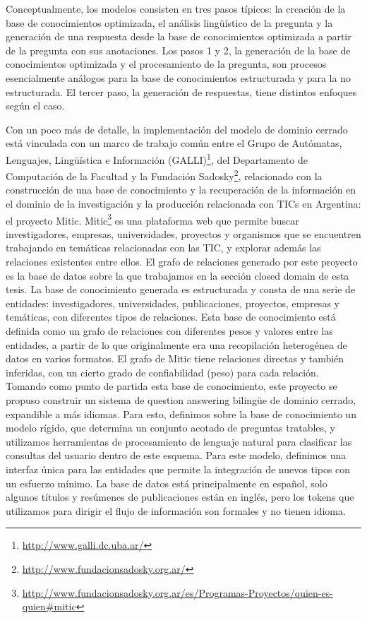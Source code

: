 Conceptualmente, los modelos consisten en tres pasos típicos: la creación de la base de conocimientos optimizada, el análisis
lingüístico de la pregunta y la generación de una respuesta desde la base de conocimientos optimizada a partir de la pregunta con sus
anotaciones. Los pasos 1 y 2, la generación de la base de conocimientos optimizada y el procesamiento de la pregunta, son procesos
esencialmente análogos para la base de conocimientos estructurada y para la no estructurada. El tercer paso, la generación de respuestas,
tiene distintos enfoques según el caso.


Con un poco más de detalle, la implementación del modelo de dominio cerrado está vinculada con un marco de trabajo común entre el Grupo de Autómatas, Lenguajes, Lingüística e Información (GALLI)\footnote{\url{http://www.galli.dc.uba.ar/}}, del Departamento de Computación de la Facultad y la Fundación Sadosky\footnote{\url{http://www.fundacionsadosky.org.ar/}}, relacionado con la construcción de una base de conocimiento y la recuperación de la información en el dominio de la investigación y la producción relacionada con TICs en Argentina: el proyecto Mitic. Mitic\footnote{\url{http://www.fundacionsadosky.org.ar/es/Programas-Proyectos/quien-es-quien\#mitic}} es una plataforma web que permite buscar investigadores, empresas, universidades, proyectos y organismos que se encuentren trabajando en temáticas relacionadas con las TIC, y explorar además las relaciones existentes entre ellos. El grafo de relaciones generado por este proyecto es la base de datos sobre la que trabajamos en la sección closed domain de esta tesis. La base de conocimiento generada es estructurada y consta de una serie de entidades: investigadores, universidades, publicaciones, proyectos, empresas y temáticas, con diferentes tipos de relaciones. Esta base de conocimiento está definida como un grafo de relaciones con diferentes pesos y valores entre las entidades, a partir de lo que originalmente era una recopilación heterogénea de datos en varios formatos. El grafo de Mitic tiene relaciones directas y también inferidas, con un cierto grado de confiabilidad (peso) para cada relación. Tomando como punto de
partida esta base de conocimiento, este proyecto se propuso construir un sistema de question answering bilingüe de dominio cerrado, expandible a más idiomas.
Para esto, definimos sobre la base de conocimiento un modelo rígido, que determina un conjunto acotado de preguntas tratables, y utilizamos herramientas de procesamiento de lenguaje natural para clasificar las consultas del usuario dentro de este esquema. Para este modelo, definimos una interfaz única para las entidades que permite la integración de nuevos tipos con un esfuerzo mínimo. La base de datos está principalmente en español, solo algunos títulos y resúmenes de publicaciones están en inglés, pero los tokens que utilizamos para dirigir el flujo de información son formales y no tienen idioma.

